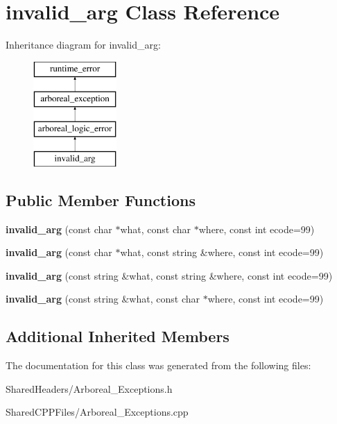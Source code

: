 \hypertarget{classinvalid__arg}{}\section{invalid\+\_\+arg Class Reference}
\label{classinvalid__arg}
Inheritance diagram for invalid\+\_\+arg\+:\begin{figure}[H]
\begin{center}
\leavevmode
\includegraphics[height=4.000000cm]{dc/d19/classinvalid__arg}
\end{center}
\end{figure}
\subsection*{Public Member Functions}
\begin{DoxyCompactItemize}
\item 
\mbox{\label{classinvalid__arg_ab470c1e208290687c57ddb80ad7c91bf}} 
{\bfseries invalid\+\_\+arg} (const char $\ast$what, const char $\ast$where, const int ecode=99)
\item 
\mbox{\label{classinvalid__arg_ac64346933956c640dc48166d3c11ea6d}} 
{\bfseries invalid\+\_\+arg} (const char $\ast$what, const string \&where, const int ecode=99)
\item 
\mbox{\label{classinvalid__arg_afd1c07ada97de63dd8b2bf8d19753649}} 
{\bfseries invalid\+\_\+arg} (const string \&what, const string \&where, const int ecode=99)
\item 
\mbox{\label{classinvalid__arg_a1b68c46a8c2ddc202eb89edf05667618}} 
{\bfseries invalid\+\_\+arg} (const string \&what, const char $\ast$where, const int ecode=99)
\end{DoxyCompactItemize}
\subsection*{Additional Inherited Members}


The documentation for this class was generated from the following files\+:\begin{DoxyCompactItemize}
\item 
Shared\+Headers/Arboreal\+\_\+\+Exceptions.\+h\item 
Shared\+C\+P\+P\+Files/Arboreal\+\_\+\+Exceptions.\+cpp\end{DoxyCompactItemize}
